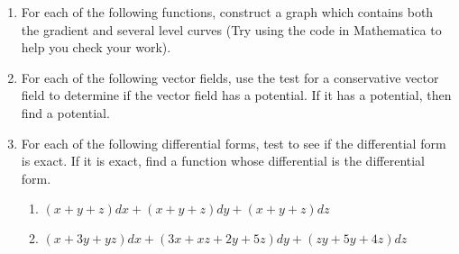 \begin{enumerate}
	\item For each of the following functions, construct a graph which contains both the gradient and several level curves (Try using the code in Mathematica to help you check your work).
\begin{enumerate}
\end{enumerate}

	\item For each of the following vector fields, use the test for a conservative vector field to determine if the vector field has a potential.  If it has a potential, then find a potential.
\begin{enumerate}
\end{enumerate}
	
	
	\item For each of the following differential forms, test to see if the differential form is exact.  If it is exact, find a function whose differential is the differential form.
\begin{enumerate}
	\item $(x+y+z)dx+(x+y+z)dy+( x+y+z)dz$
	\item $(x+3y+yz)dx+(3x+xz+2y+5z)dy+(zy+5y+4z)dz$
\end{enumerate}
	
\end{enumerate}


